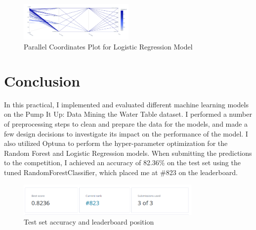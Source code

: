 \documentclass{article}
\begin{document}
\begin{figure}[H]
  \centering
  \includegraphics[width=0.5\textwidth]{img/tmp2.png}
  \caption{Parallel Coordinates Plot for Logistic Regression Model}
\end{figure}

\section{Conclusion}
In this practical, I implemented and evaluated different machine learning models on the Pump It Up: Data Mining the Water Table dataset. I performed a number of preprocessing steps to clean and prepare the data for the models, and made a few design decisions to investigate its impact on the performance of the model. I also utilized Optuna to perform the hyper-parameter optimization for the Random Forest and Logistic Regression models. When submitting the predictions to the competition, I achieved an accuracy of 82.36\% on the test set using the tuned RandomForestClassifier, which placed me at \#823 on the leaderboard.

\begin{figure}[H]
  \centering
  \includegraphics[width=0.8\textwidth]{img/leaderboard.png}
  \caption{Test set accuracy and leaderboard position}
\end{figure}

\printbibliography
\end{document}
